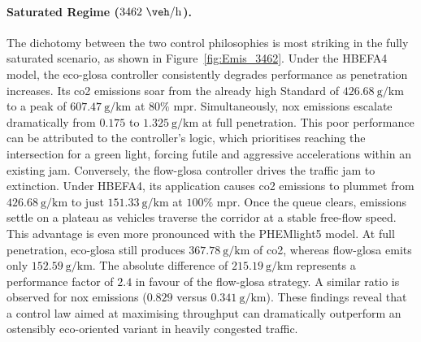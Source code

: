 \paragraph{Saturated Regime ($3462~\unit{\veh\per\hour}$).}
The dichotomy between the two control philosophies is most striking in the fully saturated scenario, as shown in Figure~\ref{fig:Emis_3462}. Under the HBEFA4 model, the \ac{eco-glosa} controller consistently degrades performance as penetration increases. Its \ac{co2} emissions soar from the already high Standard of $426.68~\unit{\gram\per\kilo\metre}$ to a peak of $607.47~\unit{\gram\per\kilo\metre}$ at $80\%$ \ac{mpr}. Simultaneously, \ac{nox} emissions escalate dramatically from $0.175$ to $1.325~\unit{\gram\per\kilo\metre}$ at full penetration. This poor performance can be attributed to the controller's logic, which prioritises reaching the intersection for a green light, forcing futile and aggressive accelerations within an existing jam.
\mynewline
Conversely, the \ac{flow-glosa} controller drives the traffic jam to extinction. Under HBEFA4, its application causes \ac{co2} emissions to plummet from $426.68~\unit{\gram\per\kilo\metre}$ to just $151.33~\unit{\gram\per\kilo\metre}$ at $100\%$ \ac{mpr}. Once the queue clears, emissions settle on a plateau as vehicles traverse the corridor at a stable free-flow speed. This advantage is even more pronounced with the PHEMlight5 model. At full penetration, \ac{eco-glosa} still produces $367.78~\unit{\gram\per\kilo\metre}$ of \ac{co2}, whereas \ac{flow-glosa} emits only $152.59~\unit{\gram\per\kilo\metre}$. The absolute difference of $215.19~\unit{\gram\per\kilo\metre}$ represents a performance factor of $2.4$ in favour of the \ac{flow-glosa} strategy. A similar ratio is observed for \ac{nox} emissions ($0.829$ versus $0.341~\unit{\gram\per\kilo\metre}$). These findings reveal that a control law aimed at maximising throughput can dramatically outperform an ostensibly eco-oriented variant in heavily congested traffic.

